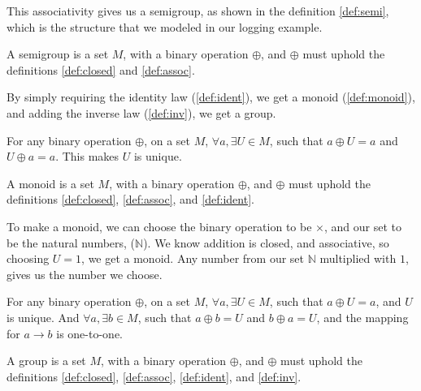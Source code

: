 This associativity gives us a semigroup, as shown in the definition
\ref{def:semi}, which is the structure that we modeled in our logging example.

\begin{definition}[Semigroup] \label{def:semi}
  A semigroup is a set $M$, with a binary operation $\oplus$, and $\oplus$ must
  uphold the definitions \ref{def:closed} and \ref{def:assoc}.
\end{definition}

By simply requiring the identity law (\ref{def:ident}), we get a
monoid (\ref{def:monoid}), and adding the inverse law
(\ref{def:inv}), we get a group.

\begin{definition} \label{def:ident}
  For any binary operation $\oplus$, on a set $M$, $\forall a, \exists U \in M$,
  such that $a \oplus U = a$ and $U \oplus a = a$. This makes $U$ is unique.
\end{definition}

\begin{definition}[Monoid] \label{def:monoid}
  A monoid is a set $M$, with a binary operation $\oplus$, and $\oplus$ must
  uphold the definitions \ref{def:closed}, \ref{def:assoc}, and \ref{def:ident}.
\end{definition}

\begin{exmp}
  To make a monoid, we can choose the binary operation to be $\times$, and our
  set to be the natural numbers, ($\mathbb{N}$). We know addition is closed, and
  associative, so choosing $U = 1$, we get a monoid. Any number from our set
  $\mathbb{N}$ multiplied with $1$, gives us the number we choose.
\end{exmp}

\begin{definition} \label{def:inv}
  For any binary operation $\oplus$, on a set $M$,
  $\forall a, \exists U \in M$, such that
  $a \oplus U = a$, and $U$ is unique.
  And $\forall a, \exists b \in M$, such that $a \oplus b = U$ and
  $b \oplus a = U$, and the mapping for $a \to b$ is one-to-one.
\end{definition}

\begin{definition}[Group] \label{def:group}
  A group is a set $M$, with a binary operation $\oplus$, and $\oplus$ must
  uphold the definitions \ref{def:closed}, \ref{def:assoc}, \ref{def:ident},
  and \ref{def:inv}.
\end{definition}

